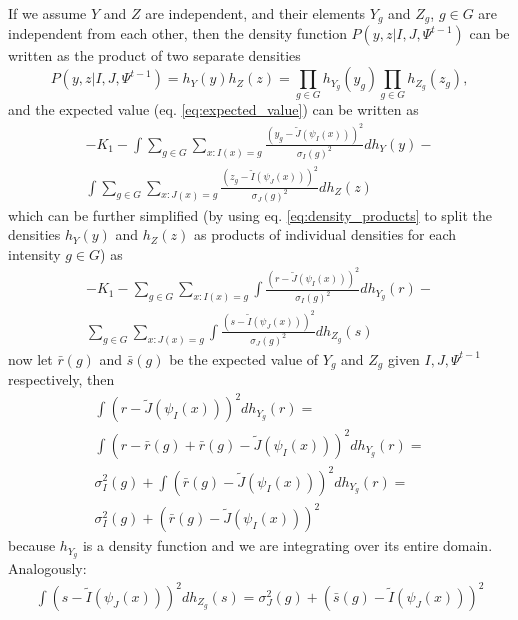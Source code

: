 \documentclass[11pt]{article}
\begin{document}
If we assume $Y$ and $Z$ are independent, and their elements $Y_g$ and $Z_g$, $g\in G$ are independent from each other, then the density function $P(y,z| I, J, \Psi^{t-1})$ can be written as the product of two separate densities
\begin{equation}\label{eq:density_products}
    P(y,z| I, J, \Psi^{t-1}) = h_{Y}(y)h_{Z}(z) = \prod_{g\in G}h_{Y_g}(y_g) \prod_{g\in G}h_{Z_g}(z_g),
\end{equation}
and the expected value (eq. \ref{eq:expected_value}) can be written as
\begin{align}
    -K_{1}-\int\sum_{g\in G} \sum_{x : I(x) = g} \frac{\left(y_g - \tilde{J}(\psi_{I}(x))\right)^{2}}{\sigma_{I}(g)^{2}}d h_{Y}(y)-\\
    \nonumber\int\sum_{g\in G} \sum_{x : J(x) = g} \frac{\left(z_g - \tilde{I}(\psi_{J}(x))\right)^{2}}{\sigma_{J}(g)^{2}}d h_{Z}(z)
\end{align}
which can be further simplified (by using eq. \ref{eq:density_products} to split the densities $h_{Y}(y)$ and $h_{Z}(z)$ as products of individual densities for each intensity $g \in G$) as
\begin{align}
    -K_{1}-\sum_{g\in G} \sum_{x : I(x) = g} \int\frac{\left(r - \tilde{J}(\psi_{I}(x))\right)^{2}}{\sigma_{I}(g)^{2}}d h_{Y_g}(r)-\\
    \nonumber\sum_{g\in G} \sum_{x : J(x) = g} \int\frac{\left(s - \tilde{I}(\psi_{J}(x))\right)^{2}}{\sigma_{J}(g)^{2}}d h_{Z_g}(s)
\end{align}
now let $\bar{r}(g)$ and $\bar{s}(g)$ be the expected value of $Y_g$ and $Z_g$ given $I, J, \Psi^{t-1}$ respectively, then
\begin{align}
    &\int\left(r - \tilde{J}(\psi_{I}(x))\right)^{2}d h_{Y_g}(r) = &\\
    &\nonumber \int\left(r - \bar{r}(g) + \bar{r}(g) - \tilde{J}(\psi_{I}(x))\right)^{2}d h_{Y_g}(r) = &\\
    &\nonumber \sigma^{2}_{I}(g) + \int\left(\bar{r}(g) - \tilde{J}(\psi_{I}(x))\right)^{2}d h_{Y_g}(r) = &\\
    &\nonumber \sigma^{2}_{I}(g) + \left(\bar{r}(g) - \tilde{J}(\psi_{I}(x))\right)^{2}&
\end{align}
because $h_{Y_g}$ is a density function and we are integrating over its entire domain. Analogously:
\begin{align}
    \int\left(s - \tilde{I}(\psi_{J}(x))\right)^{2}d h_{Z_g}(s) = \sigma^{2}_{J}(g) + \left(\bar{s}(g) - \tilde{I}(\psi_{J}(x))\right)^{2}
\end{align}
\end{document}
